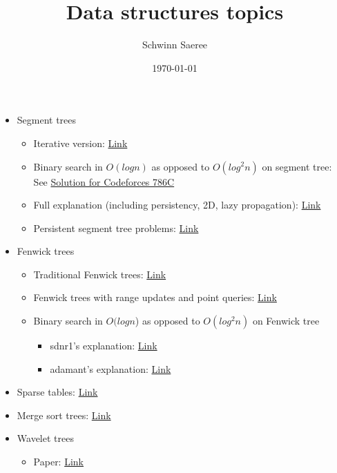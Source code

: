 \documentclass[11pt]{article}
\author{Schwinn Saeree}
\date{\today}
\title{Data structures topics}
\begin{document}
\maketitle
\tableofcontents

\begin{itemize}
\item Segment trees
\begin{itemize}
\item Iterative version: \href{https://codeforces.com/blog/entry/18051}{Link}
\item Binary search in \(O(log n)\) as opposed to \(O(log^2 n)\) on segment tree: See \href{https://codeforces.com/contest/786/submission/28673373}{Solution for Codeforces 786C}
\item Full explanation (including persistency, 2D, lazy propagation): \href{https://cp-algorithms.com/data\_structures/segment\_tree.html}{Link}
\item Persistent segment tree problems: \href{https://codeforces.com/blog/entry/56880}{Link}
\end{itemize}
\item Fenwick trees
\begin{itemize}
\item Traditional Fenwick trees: \href{https://www.hackerearth.com/practice/notes/binary-indexed-tree-or-fenwick-tree/}{Link}
\item Fenwick trees with range updates and point queries: \href{https://stackoverflow.com/questions/27875691/need-a-clear-explanation-of-range-updates-and-range-queries-binary-indexed-tree}{Link}
\item Binary search in \(O(log n\)) as opposed to \(O(log^2 n)\) on Fenwick tree
\begin{itemize}
\item sdnr1's explanation: \href{https://codeforces.com/blog/entry/61364}{Link}
\item adamant's explanation: \href{https://codeforces.com/blog/entry/11275}{Link}
\end{itemize}
\end{itemize}
\item Sparse tables: \href{https://brilliant.org/wiki/sparse-table/}{Link}
\item Merge sort trees: \href{https://discuss.codechef.com/t/merge-sort-tree-tutorial/14277}{Link}
\item Wavelet trees
\begin{itemize}
\item Paper: \href{https://ioinformatics.org/journal/v10\_2016\_19\_37.pdf}{Link}

\end{itemize}
\end{itemize}
\end{document}
